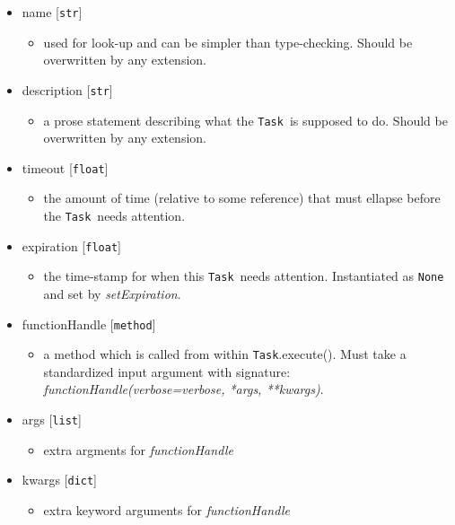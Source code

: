\documentclass{article}
\newcommand{\Task}{\texttt{Task}}
\newcommand{\pythonfloat}{\texttt{float}}
\newcommand{\pythonstr}{\texttt{str}}
\newcommand{\pythonlist}{\texttt{list}}
\newcommand{\pythondict}{\texttt{dict}}
\begin{document}
\begin{itemize}
    \item{name [\pythonstr]
        \begin{itemize}
            \item{used for look-up and can be simpler than type-checking. Should be overwritten by any extension.}
        \end{itemize}
         }
    \item{description [\pythonstr]
        \begin{itemize}
            \item{a prose statement describing what the \Task~is supposed to do. Should be overwritten by any extension.}
        \end{itemize}
         }
    \item{timeout [\pythonfloat]
        \begin{itemize}
            \item{the amount of time (relative to some reference) that must ellapse before the \Task~needs attention.}
        \end{itemize}
         }
    \item{expiration [\pythonfloat]
        \begin{itemize}
            \item{the time-stamp for when this \Task~needs attention. Instantiated as \texttt{None} and set by \textit{setExpiration}.}
        \end{itemize}
         }
    \item{functionHandle [\texttt{method}]
        \begin{itemize}
            \item{a method which is called from within \Task.execute(). Must take a standardized input argument with signature: \textit{functionHandle(verbose=verbose, *args, **kwargs)}.}
        \end{itemize}
         }
    \item{args [\pythonlist]
        \begin{itemize}
            \item{extra argments for \textit{functionHandle}}
        \end{itemize}
         }
    \item{kwargs [\pythondict]
        \begin{itemize}
            \item{extra keyword arguments for \textit{functionHandle}}
        \end{itemize}
         }
\end{itemize}
\end{document}
